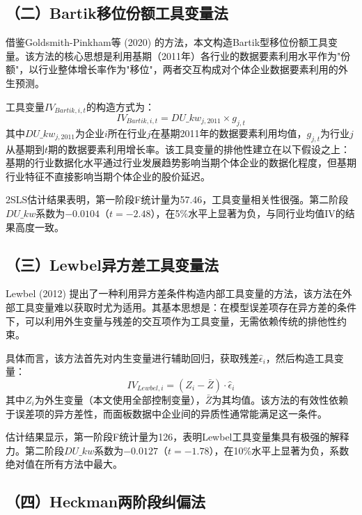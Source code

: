 \documentclass[11pt,a4paper]{article}
\begin{document}
\subsection*{（二）Bartik移位份额工具变量法}

借鉴Goldsmith-Pinkham等 (2020) 的方法，本文构造Bartik型移位份额工具变量。该方法的核心思想是利用基期（2011年）各行业的数据要素利用水平作为"份额"，以行业整体增长率作为"移位"，两者交互构成对个体企业数据要素利用的外生预测。

工具变量$IV_{Bartik,i,t}$的构造方式为：
\begin{equation}
IV_{Bartik,i,t} = DU\_kw_{j,2011} \times g_{j,t}
\end{equation}
其中$DU\_kw_{j,2011}$为企业$i$所在行业$j$在基期2011年的数据要素利用均值，$g_{j,t}$为行业$j$从基期到$t$期的数据要素利用增长率。该工具变量的排他性建立在以下假设之上：基期的行业数据化水平通过行业发展趋势影响当期个体企业的数据化程度，但基期行业特征不直接影响当期个体企业的股价延迟。

2SLS估计结果表明，第一阶段F统计量为57.46，工具变量相关性很强。第二阶段$DU\_kw$系数为$-0.0104$（$t=-2.48$），在5\%水平上显著为负，与同行业均值IV的结果高度一致。

\subsection*{（三）Lewbel异方差工具变量法}

Lewbel (2012) 提出了一种利用异方差条件构造内部工具变量的方法，该方法在外部工具变量难以获取时尤为适用。其基本思想是：在模型误差项存在异方差的条件下，可以利用外生变量与残差的交互项作为工具变量，无需依赖传统的排他性约束。

具体而言，该方法首先对内生变量进行辅助回归，获取残差$\hat{\epsilon}_i$，然后构造工具变量：
\begin{equation}
IV_{Lewbel,i} = (Z_i - \bar{Z}) \cdot \hat{\epsilon}_i
\end{equation}
其中$Z_i$为外生变量（本文使用全部控制变量），$\bar{Z}$为其均值。该方法的有效性依赖于误差项的异方差性，而面板数据中企业间的异质性通常能满足这一条件。

估计结果显示，第一阶段F统计量为126，表明Lewbel工具变量集具有极强的解释力。第二阶段$DU\_kw$系数为$-0.0127$（$t=-1.78$），在10\%水平上显著为负，系数绝对值在所有方法中最大。

\subsection*{（四）Heckman两阶段纠偏法}
\end{document}

